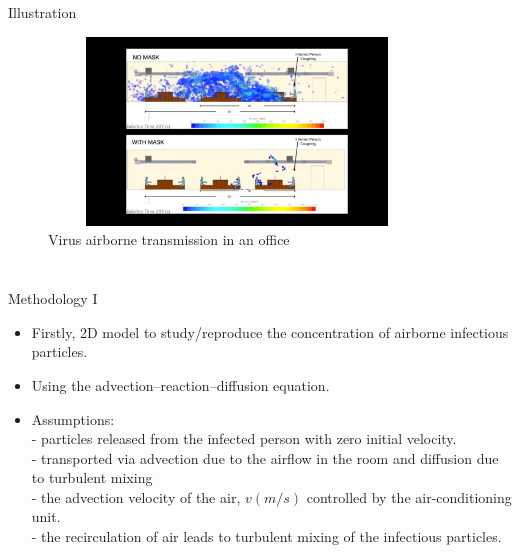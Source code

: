 \documentclass[10pt]{beamer}
\newcommand{\PIV}{}
\newcommand{\PV}{}
\begin{document}
\section{\PIV} 
\begin{frame}{Illustration}{\PIV} 
    \begin{itemize}
        \begin{figure}
         \includegraphics[width=10cm, height=5cm]{illu.png}
            \caption{Virus airborne transmission in an office }
           \end{figure}
    \end{itemize}  
\end{frame}



\section{\PV} 
\begin{frame}{Methodology I}{\PV} 
    \begin{itemize}
        \item Firstly, 2D model to study/reproduce the concentration of airborne infectious particles.
        \item Using the advection–reaction–diffusion equation.
        \item Assumptions: \\- particles  released from
        the infected person with zero initial velocity.
        \\ - transported via advection due to the airflow in the room and diffusion due to turbulent mixing
        \\ - the advection velocity of the air, $v (m/s)$ controlled by the air-conditioning unit.
        \\ -  the recirculation of air leads to turbulent mixing of the infectious particles.  
    \end{itemize}  

\end{frame}
\end{document}
